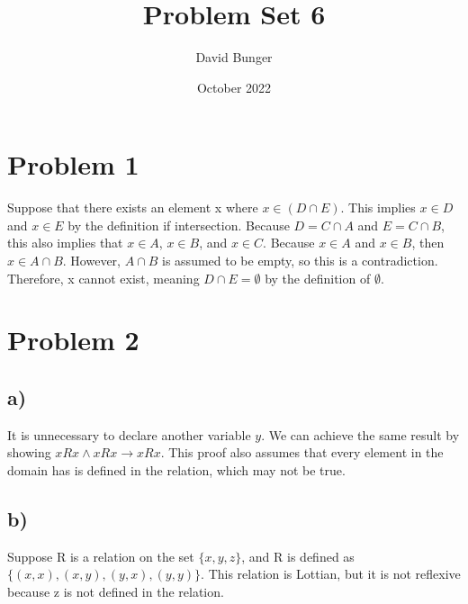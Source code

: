 \documentclass{article}
\title{Problem Set 6}
\author{David Bunger}
\date{October 2022}
\begin{document}
\maketitle

\section*{Problem 1}
Suppose that there exists an element x where $x\in (D\cap E)$. This implies $x\in D$ and $x\in E$ by the definition if intersection. Because $D=C\cap A$ and $E=C\cap B$, this also implies that $x\in A$, $x\in B$, and $x\in C$. Because $x\in A$ and $x\in B$, then $x\in A\cap B$. However, $A\cap B$ is assumed to be empty, so this is a contradiction. Therefore, x cannot exist, meaning $D\cap E=\emptyset$ by the definition of $\emptyset$.
\section*{Problem 2}
\subsection*{a)}
It is unnecessary to declare another variable $y$. We can achieve the same result by showing $xRx \land xRx \rightarrow xRx$. This proof also assumes that every element in the domain has is defined in the relation, which may not be true.
\subsection*{b)}
Suppose R is a relation on the set $\{x,y,z\}$, and R is defined as $\{(x,x),(x,y),(y,x),(y,y)\}$. This relation is Lottian, but it is not reflexive because z is not defined in the relation.
\end{document}
